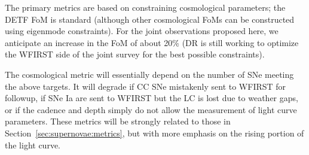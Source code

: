 
The primary metrics are based on constraining cosmological parameters; the DETF FoM is standard (although other cosmological FoMs can be constructed using eigenmode constraints). For the joint observations proposed here, we anticipate an increase in the FoM of about 20\% (DR is still working to optimize the WFIRST side of the joint survey for the best possible constraints).

The cosmological metric will essentially depend on the number of SNe meeting the above targets. It will degrade if CC SNe mistakenly sent to WFIRST for followup, if SNe Ia are sent to WFIRST but the LC is lost due to weather gaps, or if the cadence and depth simply do not allow the measurement of light curve parameters. These metrics will be strongly related to those in Section~\ref{sec:supernovae:metrics}, but with more emphasis on the rising portion of the light curve.










\navigationbar
